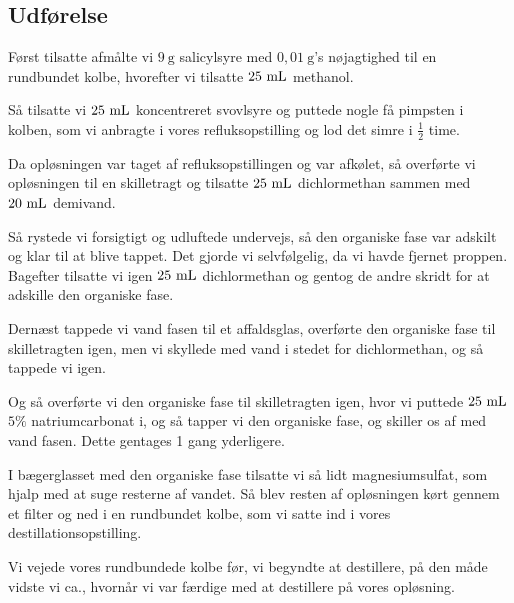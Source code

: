\subsection*{Udførelse}
Først tilsatte afmålte vi $9\ \unit{\gram}$ salicylsyre
med $0{,}01\ \unit{\gram}$'s nøjagtighed til en rundbundet kolbe,
hvorefter vi tilsatte $25\ \ml$ methanol.

Så tilsatte vi $25\ \ml$ koncentreret svovlsyre
og puttede nogle få pimpsten i kolben,
som vi anbragte i vores refluksopstilling og lod det simre i $\frac{1}{2}$ time.

Da opløsningen var taget af refluksopstillingen og var afkølet,
så overførte vi opløsningen til en skilletragt og tilsatte
$25\ \ml$ dichlormethan sammen med $20\ \ml$ demivand.

Så rystede vi forsigtigt og udluftede undervejs,
så den organiske fase var adskilt og klar til at blive tappet.
Det gjorde vi selvfølgelig,
da vi havde fjernet proppen.
Bagefter tilsatte vi igen $25\ \ml$ dichlormethan
og gentog de andre skridt for at adskille
den organiske fase.

Dernæst tappede vi vand fasen til et affaldsglas,
overførte den organiske fase til skilletragten igen,
men vi skyllede med vand i stedet for dichlormethan,
og så tappede vi igen.

Og så overførte vi den organiske fase til skilletragten igen,
hvor vi puttede $25\ \ml$ $5\%$ natriumcarbonat i,
og så tapper vi den organiske fase,
og skiller os af med vand fasen. Dette gentages 1 gang yderligere.

I bægerglasset med den organiske fase
tilsatte vi så lidt magnesiumsulfat,
som hjalp med at suge resterne af vandet.
Så blev resten af opløsningen kørt gennem et filter
og ned i en rundbundet kolbe,
som vi satte ind i vores destillationsopstilling.

Vi vejede vores rundbundede kolbe før, vi begyndte at destillere,
på den måde vidste vi ca., hvornår vi var færdige
med at destillere på vores opløsning.
